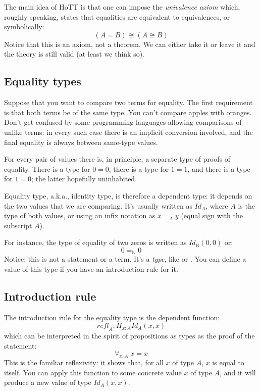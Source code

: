 \documentclass[DaoFP]{subfiles}
\begin{document}
The main idea of HoTT is that one can impose the \emph{univalence axiom} which, roughly speaking, states that equalities are equivalent to equivalences, or symbolically:
\[ (A = B) \cong (A \cong B) \]
Notice that this is an axiom, not a theorem. We can either take it or leave it and the theory is still valid (at least we think so).
\subsection{Equality types}

Suppose that you want to compare two terms for equality. The first requirement is that both terms be of the same type. You can't compare apples with oranges. Don't get confused by some programming languages allowing comparisons of unlike terms: in every such case there is an implicit conversion involved, and the final equality is always between same-type values. 

For every pair of values there is, in principle, a separate type of proofs of equality. There is a type for $0 = 0$, there is a type for $1=1$, and there is a type for $1 = 0$; the latter hopefully uninhabited. 

Equality type, a.k.a., identity type, is therefore a dependent type: it depends on the two values that we are comparing. It's usually written as $\mathit{Id}_A$, where $A$ is the type of both values, or using an infix notation as $x=_A y$ (equal sign with the subscript $A$). 

For instance, the type of equality of two zeros is written as $\mathit{Id}_{\mathbb{N}} (0, 0)$ or:
\[ 0 =_{\mathbb{N}} 0 \]
Notice: this is not a statement or a term. It's a \emph{type}, like  or . You can define a value of this type if you have an introduction rule for it.

\subsection{Introduction rule}

The introduction rule for the equality type is the dependent function: 
\[ \mathit{refl}_A \colon \Pi_{x : A}  \mathit{Id}_A  (x, x)\]
which can be interpreted in the spirit of propositions as types as the proof of the statement:
\[ \forall _{x:A} \;x = x \]
This is the familiar reflexivity: it shows that, for all $x$ of type $A$, $x$ is equal to itself. You can apply this function to some concrete value $x$ of type $A$, and it will produce a new value of type $\mathit{Id}_A  (x, x)$.
\end{document}
